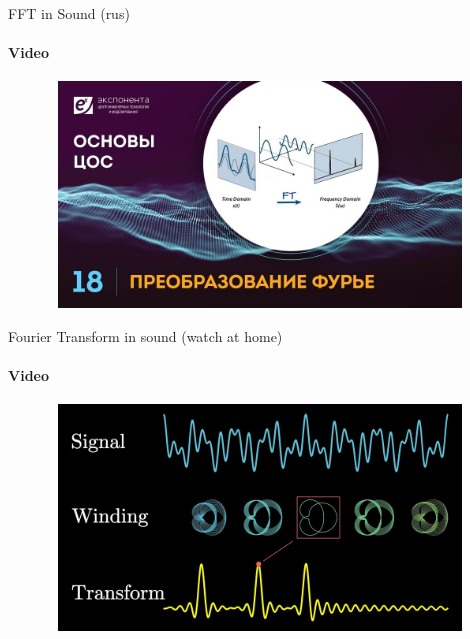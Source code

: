 \documentclass[aspectratio=169]{beamer}
\begin{document}
\begin{frame}[t]{FFT in Sound (rus)}
    \framesubtitle{Video}
    \vspace{-0.6cm}
    \begin{figure}[H]
        \href{https://youtu.be/T0xlzPBdx6s?t=237}{
            \centering\includegraphics[height=6cm,width=1\textwidth,keepaspectratio]{fft_sound.jpg}}
        \label{fig:fft_sound.jpg}
    \end{figure}
\end{frame}

\begin{frame}[t]{Fourier Transform in sound (watch at home)}
    \framesubtitle{Video}
    \vspace{-0.6cm}
    \begin{figure}[H]
        \href{https://youtu.be/spUNpyF58BY}{
            \centering\includegraphics[height=6cm,width=1\textwidth,keepaspectratio]{fourier_sound.jpg}}
        \label{fig:fourier_sound.jpg}
    \end{figure}
\end{frame}
\end{document}
